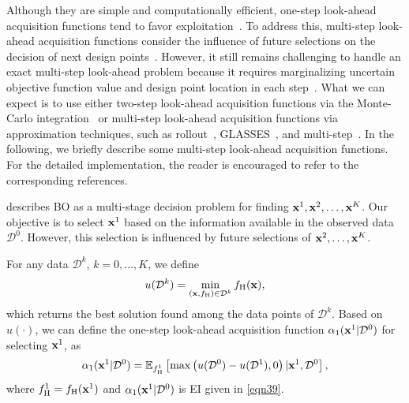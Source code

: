 \documentclass[journal ]{new-aiaa}
\begin{document}
	Although they are simple and computationally efficient, one-step look-ahead acquisition functions tend to favor exploitation~\citep{Hennig2022}.
	To address this, multi-step look-ahead acquisition functions consider the influence of future selections on the decision of next design points~\citep[see e.g.,][]{Streltsov1999,Ginsbourger2010}.
	However, it still remains challenging to handle an exact multi-step look-ahead problem because it requires marginalizing uncertain objective function value and design point location in each step~\citep{Gonzalez2016}.
	What we can expect is to use either
	two-step look-ahead acquisition functions via the Monte-Carlo integration~\citep{WuJ2019} or multi-step look-ahead acquisition functions via approximation techniques, such as rollout~\citep{Lam2016,Lee2020}, GLASSES~\citep{Gonzalez2016}, and multi-step~\citep{Jiang2020}.
	In the following, we briefly describe some multi-step look-ahead acquisition functions.
	For the detailed implementation, the reader is encouraged to refer to the corresponding references.
	
	 describes BO as a multi-stage decision problem for finding ${\bf x}^1,{\bf x}^2,\dots,{\bf x}^{K}$.
	Our objective is to select ${\bf x}^1$ based on the information available in the observed data $\mathcal{D}^0$.
	However, this selection is influenced by future selections of ${\bf x}^2,\dots,{\bf x}^{K}$.
	
	For any data $\mathcal{D}^k$, $k=0,\dots,K$, we define
	\begin{equation}\label{eqn49}
		u(\mathcal{D}^k) = \underset{({\bf x},f_{\text{H}}) \in \mathcal{D}^k}{\min}\,f_{\text{H}}({\bf x}),
	\end{equation} 
	which returns the best solution found among the data points of $\mathcal{D}^k$.
	Based on $u(\cdot)$, we can define the one-step look-ahead acquisition function $\alpha_1({\bf x}^1|\mathcal{D}^{0})$ for selecting ${\bf x}^1$, as
	\begin{equation}\label{eqn50}
		\alpha_1({\bf x}^1|\mathcal{D}^0)
		=\mathbb{E}_{f^1_\text{H}}\left[\max\left(u(\mathcal{D}^0) - u(\mathcal{D}^1),0\right)
		|{\bf x}^1,\mathcal{D}^0\right],
	\end{equation} 
	where $f^1_\text{H} = f_\text{H}({\bf x}^1)$ and $\alpha_1({\bf x}^1|\mathcal{D}^{0})$ is EI given in \cref{eqn39}.
	
\end{document}

